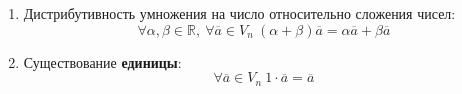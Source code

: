 \begin{enumerate}
	\item Дистрибутивность умножения на число относительно сложения чисел:
	\begin{equation*}
	\forall \alpha, \beta \in \mathbb R, \
	\forall \overline a \in V_n \
	(\alpha + \beta) \overline a = \alpha \overline a + \beta \overline a
	\end{equation*}
	
	\item Существование \textbf{единицы}:
	\begin{equation*}
	\forall \overline a \in V_n \
	1 \cdot \overline a = \overline a
	\end{equation*}
\end{enumerate}
